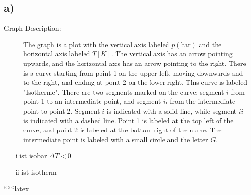 

\subsection*{a)}

\begin{description}
    \item[Graph Description:] The graph is a plot with the vertical axis labeled \( p(\text{bar}) \) and the horizontal axis labeled \( T [K] \). The vertical axis has an arrow pointing upwards, and the horizontal axis has an arrow pointing to the right. There is a curve starting from point 1 on the upper left, moving downwards and to the right, and ending at point 2 on the lower right. This curve is labeled "Isotherme". There are two segments marked on the curve: segment \( i \) from point 1 to an intermediate point, and segment \( ii \) from the intermediate point to point 2. Segment \( i \) is indicated with a solid line, while segment \( ii \) is indicated with a dashed line. Point 1 is labeled at the top left of the curve, and point 2 is labeled at the bottom right of the curve. The intermediate point is labeled with a small circle and the letter \( G \).
\end{description}

\begin{itemize}
    \item[i] ist isobar \(\Delta T < 0\)
    \item[ii] ist isotherm
\end{itemize}

``````latex